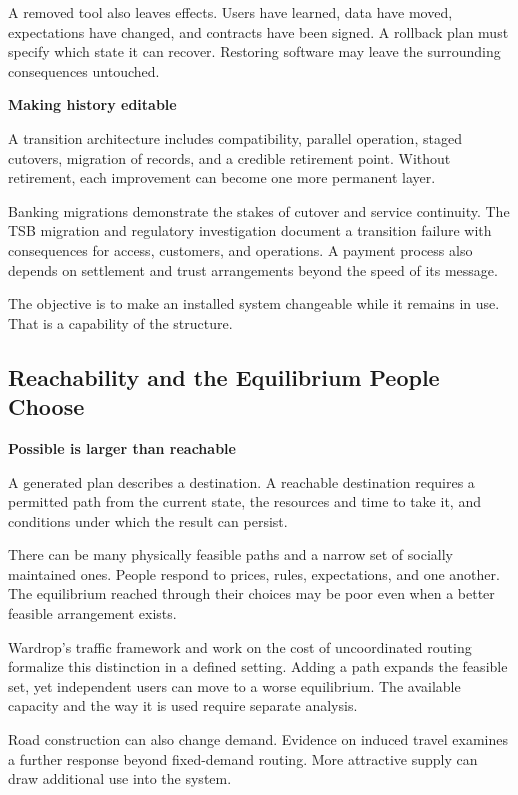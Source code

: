 \documentclass[11pt,openany]{book}
\newcommand{\subhead}[1]{\par\medskip\noindent\textbf{#1}\par\nobreak\smallskip}
\begin{document}
A removed tool also leaves effects. Users have learned, data have moved, expectations have changed, and contracts have been signed. A rollback plan must specify which state it can recover. Restoring software may leave the surrounding consequences untouched.

\subhead{Making history editable}

A transition architecture includes compatibility, parallel operation, staged cutovers, migration of records, and a credible retirement point. Without retirement, each improvement can become one more permanent layer.

Banking migrations demonstrate the stakes of cutover and service continuity. The TSB migration and regulatory investigation document a transition failure with consequences for access, customers, and operations.\cite{tsb2019migration} A payment process also depends on settlement and trust arrangements beyond the speed of its message.\cite{kahn2009why}

The objective is to make an installed system changeable while it remains in use. That is a capability of the structure.

\subsection{Reachability and the Equilibrium People Choose}

\subhead{Possible is larger than reachable}

A generated plan describes a destination. A reachable destination requires a permitted path from the current state, the resources and time to take it, and conditions under which the result can persist.

There can be many physically feasible paths and a narrow set of socially maintained ones. People respond to prices, rules, expectations, and one another. The equilibrium reached through their choices may be poor even when a better feasible arrangement exists.

Wardrop's traffic framework and work on the cost of uncoordinated routing formalize this distinction in a defined setting.\cite{wardrop1952some,roughgarden2002how} Adding a path expands the feasible set, yet independent users can move to a worse equilibrium. The available capacity and the way it is used require separate analysis.

Road construction can also change demand. Evidence on induced travel examines a further response beyond fixed-demand routing.\cite{duranton2011fundamental} More attractive supply can draw additional use into the system.
\end{document}
